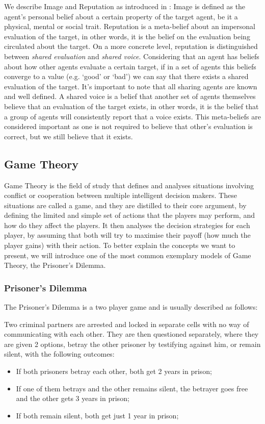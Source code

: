 We describe Image and Reputation as introduced in \cite{Sabater2006}:
Image is defined as the agent's personal belief about a certain property of the target agent, be it a physical, mental or social trait. Reputation is a meta-belief about an impersonal evaluation of the target, in other words, it is the belief on the evaluation being circulated about the target. On a more concrete level, reputation is distinguished between \textit{shared evaluation} and \textit{shared voice}. Considering that an agent has beliefs about how other agents evaluate a certain target, if in a set of agents this beliefs converge to a value (e.g. `good' or `bad') we can say that there exists a shared evaluation of the target. It's important to note that all sharing agents are known and well defined. A shared voice is a belief that another set of agents themselves believe that an evaluation of the target exists, in other words, it is the belief that a group of agents will consistently report that a voice exists. This meta-beliefs are considered important as one is not required to believe that other's evaluation is correct, but we still believe that it exists.


\subsection{Game Theory}
\label{subsec:GameTheory}
Game Theory is the field of study that defines and analyses situations involving conflict or cooperation between multiple intelligent decision makers. These situations are called a game, and they are distilled to their core argument, by defining the limited and simple set of actions that the players may perform, and how do they affect the players. It then analyses the decision strategies for each player, by assuming that both will try to maximise their payoff (how much the player gains) with their action. To better explain the concepts we want to present, we will introduce one of the most common exemplary models of Game Theory, the Prisoner's Dilemma.

\subsubsection{Prisoner's Dilemma}
\label{subsubsec:PrisonersDilemma}
The Prisoner's Dilemma is a two player game and is usually described as follows:

Two criminal partners are arrested and locked in separate cells with no way of communicating with each other. They are then questioned separately, where they are given 2 options, betray the other prisoner by testifying against him, or remain silent, with the following outcomes:
\begin{itemize}
	\item If both prisoners betray each other, both get 2 years in prison;
	\item If one of them betrays and the other remains silent, the betrayer goes free and the other gets 3 years in prison;
	\item If both remain silent, both get just 1 year in prison;
\end{itemize}

